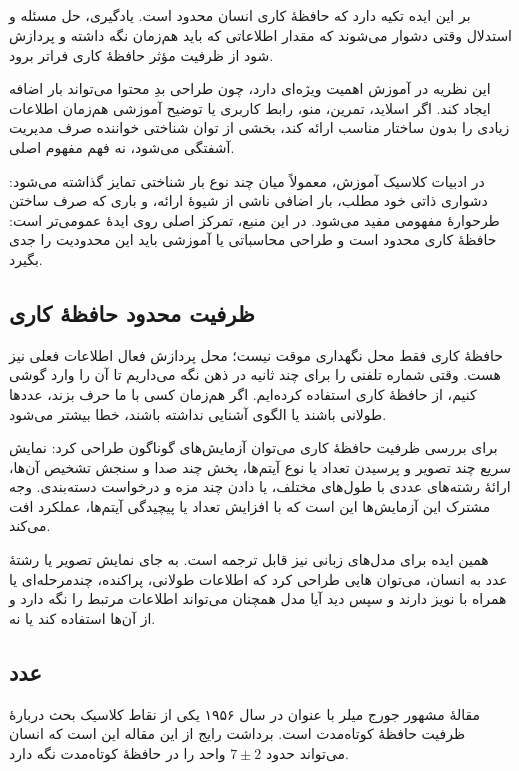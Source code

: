 \subsection{}
 بر این ایده تکیه دارد که حافظهٔ کاری انسان محدود است. یادگیری، حل مسئله و استدلال وقتی دشوار می‌شوند که مقدار اطلاعاتی که باید هم‌زمان نگه داشته و پردازش شود از ظرفیت مؤثر حافظهٔ کاری فراتر برود.

این نظریه در آموزش اهمیت ویژه‌ای دارد، چون طراحی بدِ محتوا می‌تواند بار اضافه ایجاد کند. اگر اسلاید، تمرین، منو، رابط کاربری یا توضیح آموزشی هم‌زمان اطلاعات زیادی را بدون ساختار مناسب ارائه کند، بخشی از توان شناختی خواننده صرف مدیریت آشفتگی می‌شود، نه فهم مفهوم اصلی.

در ادبیات کلاسیک آموزش، معمولاً میان چند نوع بار شناختی تمایز گذاشته می‌شود: دشواری ذاتی خود مطلب، بار اضافی ناشی از شیوهٔ ارائه، و باری که صرف ساختن طرحوارهٔ مفهومی مفید می‌شود. در این منبع، تمرکز اصلی روی ایدهٔ عمومی‌تر است: حافظهٔ کاری محدود است و طراحی محاسباتی یا آموزشی باید این محدودیت را جدی بگیرد.

\subsection{ظرفیت محدود حافظهٔ کاری}
حافظهٔ کاری فقط محل نگهداری موقت نیست؛ محل پردازش فعال اطلاعات فعلی نیز هست. وقتی شماره تلفنی را برای چند ثانیه در ذهن نگه می‌داریم تا آن را وارد گوشی کنیم، از حافظهٔ کاری استفاده کرده‌ایم. اگر هم‌زمان کسی با ما حرف بزند، عددها طولانی باشند یا الگوی آشنایی نداشته باشند، خطا بیشتر می‌شود.

برای بررسی ظرفیت حافظهٔ کاری می‌توان آزمایش‌های گوناگون طراحی کرد: نمایش سریع چند تصویر و پرسیدن تعداد یا نوع آیتم‌ها، پخش چند صدا و سنجش تشخیص آن‌ها، ارائهٔ رشته‌های عددی با طول‌های مختلف، یا دادن چند مزه و درخواست دسته‌بندی. وجه مشترک این آزمایش‌ها این است که با افزایش تعداد یا پیچیدگی آیتم‌ها، عملکرد افت می‌کند.

همین ایده برای مدل‌های زبانی نیز قابل ترجمه است. به جای نمایش تصویر یا رشتهٔ عدد به انسان، می‌توان هایی طراحی کرد که اطلاعات طولانی، پراکنده، چندمرحله‌ای یا همراه با نویز دارند و سپس دید آیا مدل همچنان می‌تواند اطلاعات مرتبط را نگه دارد و از آن‌ها استفاده کند یا نه.

\subsection{\texorpdfstring{عدد }{عدد 7 ± 2}}
مقالهٔ مشهور جورج میلر با عنوان  در سال ۱۹۵۶ یکی از نقاط کلاسیک بحث دربارهٔ ظرفیت حافظهٔ کوتاه‌مدت است. برداشت رایج از این مقاله این است که انسان می‌تواند حدود \(7 \pm 2\) واحد را در حافظهٔ کوتاه‌مدت نگه دارد.

